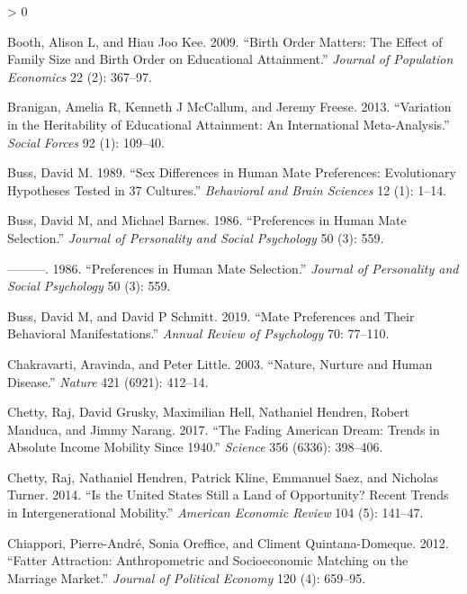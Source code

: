 \documentclass[
]{article}
\newlength{\cslhangindent}
\newenvironment{CSLReferences}[2] %
 {%
  \setlength{\parindent}{0pt}
  \ifodd #1 \everypar{\setlength{\hangindent}{\cslhangindent}}\ignorespaces\fi
  \ifnum #2 > 0
  \setlength{\parskip}{#2\baselineskip}
  \fi
 }%
 {}
\begin{document}
\begin{CSLReferences}{1}{0}
\leavevmode\hypertarget{ref-booth2009birth}{}%
Booth, Alison L, and Hiau Joo Kee. 2009. {``Birth Order Matters: The Effect of Family Size and Birth Order on Educational Attainment.''} \emph{Journal of Population Economics} 22 (2): 367--97.

\leavevmode\hypertarget{ref-branigan2013variation}{}%
Branigan, Amelia R, Kenneth J McCallum, and Jeremy Freese. 2013. {``Variation in the Heritability of Educational Attainment: An International Meta-Analysis.''} \emph{Social Forces} 92 (1): 109--40.

\leavevmode\hypertarget{ref-buss1989sex}{}%
Buss, David M. 1989. {``Sex Differences in Human Mate Preferences: Evolutionary Hypotheses Tested in 37 Cultures.''} \emph{Behavioral and Brain Sciences} 12 (1): 1--14.

\leavevmode\hypertarget{ref-buss1986preferences}{}%
Buss, David M, and Michael Barnes. 1986. {``Preferences in Human Mate Selection.''} \emph{Journal of Personality and Social Psychology} 50 (3): 559.

\leavevmode\hypertarget{ref-buss1986preferences}{}%
---------. 1986. {``Preferences in Human Mate Selection.''} \emph{Journal of Personality and Social Psychology} 50 (3): 559.

\leavevmode\hypertarget{ref-buss2019mate}{}%
Buss, David M, and David P Schmitt. 2019. {``Mate Preferences and Their Behavioral Manifestations.''} \emph{Annual Review of Psychology} 70: 77--110.

\leavevmode\hypertarget{ref-chakravarti2003nature}{}%
Chakravarti, Aravinda, and Peter Little. 2003. {``Nature, Nurture and Human Disease.''} \emph{Nature} 421 (6921): 412--14.

\leavevmode\hypertarget{ref-chetty2017fading}{}%
Chetty, Raj, David Grusky, Maximilian Hell, Nathaniel Hendren, Robert Manduca, and Jimmy Narang. 2017. {``The Fading American Dream: Trends in Absolute Income Mobility Since 1940.''} \emph{Science} 356 (6336): 398--406.

\leavevmode\hypertarget{ref-chetty2014united}{}%
Chetty, Raj, Nathaniel Hendren, Patrick Kline, Emmanuel Saez, and Nicholas Turner. 2014. {``Is the United States Still a Land of Opportunity? Recent Trends in Intergenerational Mobility.''} \emph{American Economic Review} 104 (5): 141--47.

\leavevmode\hypertarget{ref-chiappori2012fatter}{}%
Chiappori, Pierre-André, Sonia Oreffice, and Climent Quintana-Domeque. 2012. {``Fatter Attraction: Anthropometric and Socioeconomic Matching on the Marriage Market.''} \emph{Journal of Political Economy} 120 (4): 659--95.


\end{CSLReferences}
\end{document}
